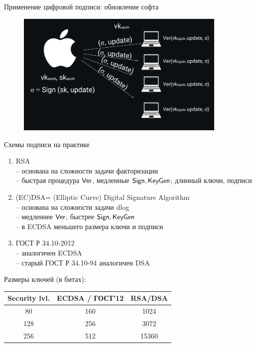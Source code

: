 \documentclass[usenames,dvipsnames,8pt,aspectratio=169]{beamer}
\begin{document}
\begin{frame}{Применение цифровой подписи: обновление софта}

\begin{figure}
	\hspace{-60pt}
	\includegraphics[width=0.9\textwidth]{Signature_software}
\end{figure}
\end{frame}

\begin{frame}{Схемы подписи на практике}
\Large
\begin{enumerate}
	\itemsep10pt
	\item {\color{Orange} RSA} \\
	-- основана на сложности задачи {\color{Orange} факторизации}\\
	-- быстрая процедура $\textsf{Ver}$, медленные $\textsf{Sign}, \textsf{KeyGen}$; длинный ключи, подписи
	
	\item {\color{Orange} (EC)DSA= (Elliptic Curve) Digital Signature Algorithm} \\
	-- основана на сложности задачи  {\color{Orange} dlog}\\
	-- медленнее $\textsf{Ver}$, быстрее $\textsf{Sign}, \textsf{KeyGen}$\\
	-- в ECDSA меньшего размера ключи и подписи
	\pause
	\item {\color{Orange} ГОСТ Р 34.10-2012 }  \\
	-- аналогичен ECDSA \\
	-- старый ГОСТ Р 34.10-94 аналогичен DSA
\end{enumerate}
\pause
\centering

Размеры ключей (в битах):\\[5pt]
\begin{tabular}{c | c| c}
	Security lvl. & ECDSA / ГОСТ'12 & RSA/DSA \\ \hline
	80 & 160 & 1024 \\
	128 & 256 & 3072 \\
	256 & 512 & 15360
\end{tabular}
\end{frame}
\end{document}
